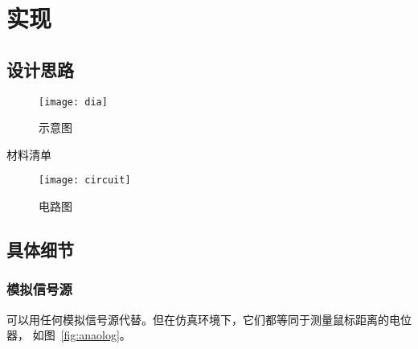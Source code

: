 \documentclass[../main]{subfiles}
\begin{document}
\chapter{实现}%
\label{cha:realize}

\section{设计思路}%
\label{sec:design}

\begin{figure}[htpb]
  \centering
  \texttt{[image: dia]}
  \caption{示意图}%
  \label{fig:dia}
\end{figure}

\begin{table}[htpb]
  \centering
  \caption{材料清单}%
  \label{tab:bom}
\end{table}

\begin{figure}[htpb]
  \centering
  \texttt{[image: circuit]}
  \caption{电路图}%
  \label{fig:circuit}
\end{figure}

\section{具体细节}%
\label{sec:detail}

\subsection{模拟信号源}%
\label{sub:analog}

可以用任何模拟信号源代替。但在仿真环境下，它们都等同于测量鼠标距离的电位器，
如图~\ref{fig:anaolog}。
\end{document}

